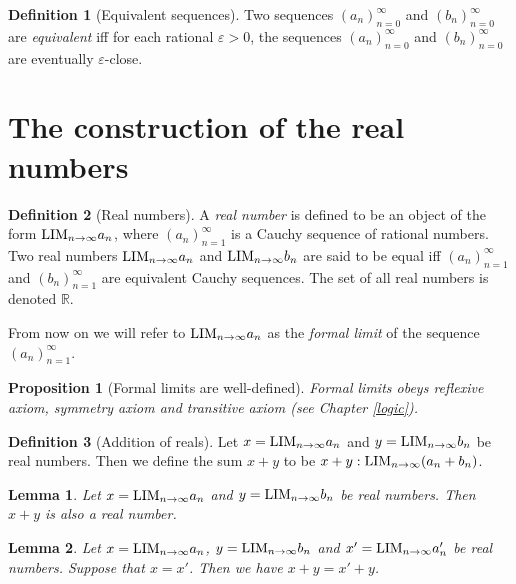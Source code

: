 \documentclass[
]{book}
\newtheorem{lemma}{Lemma}[chapter]
\newtheorem{proposition}{Proposition}[chapter]
\theoremstyle{definition}
\newtheorem{definition}{Definition}[chapter]
\theoremstyle{definition}
\theoremstyle{definition}
\theoremstyle{definition}
\theoremstyle{remark}
\begin{document}
\begin{definition}[Equivalent sequences]
Two sequences \((a_n)_{n=0}^{\infty}\) and \((b_n)_{n=0}^{\infty}\) are \emph{equivalent} iff for each rational \(\varepsilon >0\), the sequences \((a_n)_{n=0}^{\infty}\) and \((b_n)_{n=0}^{\infty}\) are eventually \(\varepsilon\)-close.
\end{definition}

\section{The construction of the real numbers}\label{the-construction-of-the-real-numbers}

\begin{definition}[Real numbers]
A \emph{real number} is defined to be an object of the form \({\rm LIM}_{n\to \infty}a_n\), where \((a_n)_{n=1}^{\infty}\) is a Cauchy sequence of rational numbers. Two real numbers \({\rm LIM}_{n\to \infty}a_n\) and \({\rm LIM}_{n\to \infty}b_n\) are said to be equal iff \((a_n)_{n=1}^{\infty}\) and \((b_n)_{n=1}^{\infty}\) are equivalent Cauchy sequences. The set of all real numbers is denoted \(\mathbb{R}\).
\end{definition}

From now on we will refer to \({\rm LIM}_{n\to \infty}a_n\) as the \emph{formal limit} of the sequence \((a_n)_{n=1}^{\infty}\).

\begin{proposition}[Formal limits are well-defined]
Formal limits obeys reflexive axiom, symmetry axiom and transitive axiom (see Chapter \ref{logic}).
\end{proposition}

\begin{definition}[Addition of reals]
Let \(x={\rm LIM}_{n\to \infty}a_n\) and \(y={\rm LIM}_{n\to \infty}b_n\) be real numbers. Then we define the sum \(x+y\) to be \(x+y:{\rm LIM}_{n\to \infty}(a_n+b_n)\).
\end{definition}

\begin{lemma}
Let \(x={\rm LIM}_{n\to \infty}a_n\) and \(y={\rm LIM}_{n\to \infty}b_n\) be real numbers. Then \(x+y\) is also a real number.
\end{lemma}

\begin{lemma}
Let \(x={\rm LIM}_{n\to \infty}a_n\), \(y={\rm LIM}_{n\to \infty}b_n\) and \(x'={\rm LIM}_{n\to \infty}a_n'\) be real numbers. Suppose that \(x=x'\). Then we have \(x+y=x'+y\).
\end{lemma}
\end{document}
